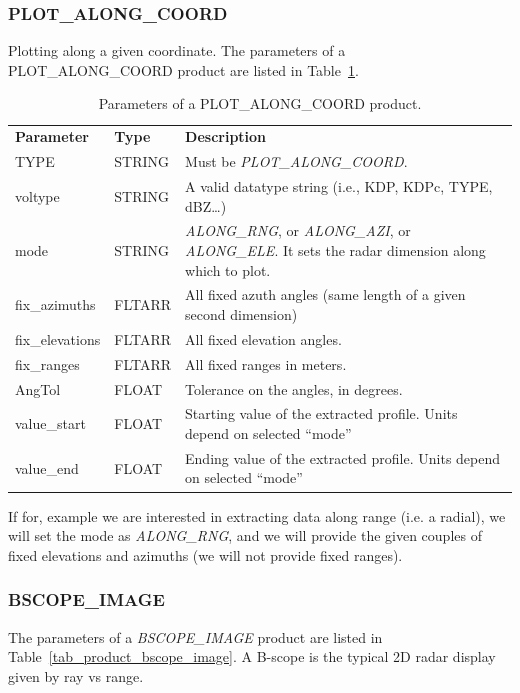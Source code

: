 \documentclass[a4paper,11pt,pdftex,twoside]{scrartcl}
\renewcommand{\bf}{\normalfont \bfseries}
\begin{document}
{{{\subsubsection{PLOT\_ALONG\_COORD}
  \label{subsec_plot_along_coord}
Plotting along a given coordinate. The parameters of a PLOT\_ALONG\_COORD product are listed in Table~\ref{tab_product_plot_along_coord}.

\begin{table}[H]
 \begin{tabularx}{\textwidth}{llX}
 \bf{Parameter}  & \bf{Type}  & \bf{Description}\\
 TYPE           & STRING     & Must be \emph{PLOT\_ALONG\_COORD}.\\
 voltype        & STRING     & A valid datatype string (i.e., KDP, KDPc, TYPE, dBZ\dots)\\
 mode           & STRING     & \emph{ALONG\_RNG}, or \emph{ALONG\_AZI}, or \emph{ALONG\_ELE}. It sets the radar dimension along which to plot. \\
 fix\_azimuths & FLTARR & All fixed azuth angles (same length of a given second dimension) \\
 fix\_elevations & FLTARR & All fixed elevation angles. \\
 fix\_ranges & FLTARR &  All fixed ranges in meters. \\
 AngTol & FLOAT & Tolerance on the angles, in degrees. \\
 value\_start & FLOAT & Starting value of the extracted profile. Units depend on selected ``mode'' \\
 value\_end   & FLOAT & Ending value of the extracted profile. Units depend on selected ``mode''\\
 \end{tabularx}
 \caption{Parameters of a PLOT\_ALONG\_COORD product.}
 \label{tab_product_plot_along_coord}
 \end{table}

If for, example we are interested in extracting data along range (i.e. a radial), we will set the mode as \emph{ALONG\_RNG}, and we will provide the given couples of fixed elevations and azimuths (we will not provide fixed ranges).

 \subsubsection{BSCOPE\_IMAGE}
 \label{subsec_bscope_image}

The parameters of a \emph{BSCOPE\_IMAGE} product are listed in Table~\ref{tab_product_bscope_image}.
A B-scope is the typical 2D radar display given by ray vs range.

}}}
\end{document}
